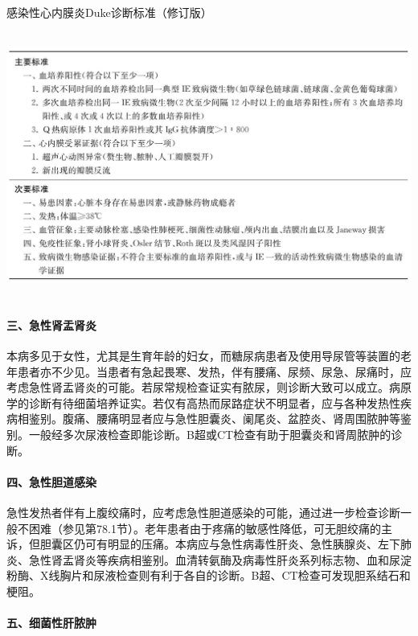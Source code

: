 \begin{table}[htbp]
\centering
\caption{感染性心内膜炎Duke诊断标准（修订版）}
\label{tab2-2}
\includegraphics[width=5.91667in,height=3.44792in]{./images/Image00006.jpg}
\end{table}

\paragraph{三、急性肾盂肾炎}

本病多见于女性，尤其是生育年龄的妇女，而糖尿病患者及使用导尿管等装置的老年患者亦不少见。当患者有急起畏寒、发热，伴有腰痛、尿频、尿急、尿痛时，应考虑急性肾盂肾炎的可能。若尿常规检查证实有脓尿，则诊断大致可以成立。病原学的诊断有待细菌培养证实。若仅有高热而尿路症状不明显者，应与各种发热性疾病相鉴别。腹痛、腰痛明显者应与急性胆囊炎、阑尾炎、盆腔炎、肾周围脓肿等鉴别。一般经多次尿液检查即能诊断。B超或CT检查有助于胆囊炎和肾周脓肿的诊断。

\paragraph{四、急性胆道感染}

急性发热者伴有上腹绞痛时，应考虑急性胆道感染的可能，通过进一步检查诊断一般不困难（参见第78.1节）。老年患者由于疼痛的敏感性降低，可无胆绞痛的主诉，但胆囊区仍可有明显的压痛。本病应与急性病毒性肝炎、急性胰腺炎、左下肺炎、急性肾盂肾炎等疾病相鉴别。血清转氨酶及病毒性肝炎系列标志物、血和尿淀粉酶、X线胸片和尿液检查则有利于各自的诊断。B超、CT检查可发现胆系结石和梗阻。

\paragraph{五、细菌性肝脓肿}

